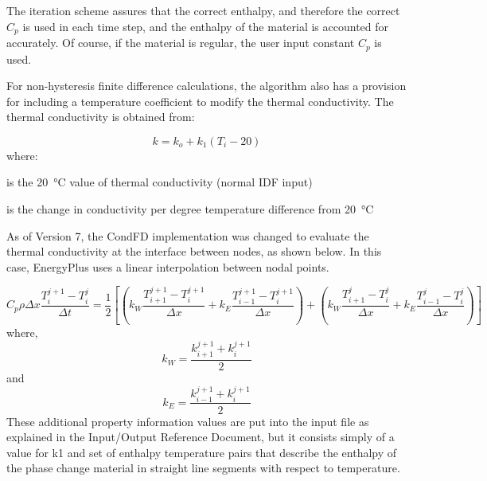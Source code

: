 The iteration scheme assures that the correct enthalpy, and therefore the
correct $C_p$ is used in each time step, and the enthalpy of the material is
accounted for accurately. Of course, if the material is regular, the user input
constant $C_p$ is used.

For non-hysteresis finite difference calculations, the algorithm also has a
provision for including a temperature coefficient to modify the thermal
conductivity. The thermal conductivity is obtained from:

\begin{equation}
k = k_o + k_1\left( T_i - 20 \right)
\end{equation}
%
where:
\begin{wherelist}
\item[k_o] is the \SI{20}{\celsius} value of thermal conductivity (normal IDF
input)
\item[k_1] is the change in conductivity per degree temperature difference from
\SI{20}{\celsius}
\end{wherelist}

As of Version 7, the CondFD implementation was changed to evaluate the thermal
conductivity at the interface between nodes, as shown below. In this case,
EnergyPlus uses a linear interpolation between nodal points.

\begin{equation}
C_p\rho\Delta x\frac{T_i^{j + 1} - T_i^j}{\Delta t} =
\frac{1}{2}\left[ \left( k_W\frac{T_{i + 1}^{j + 1} - T_i^{j + 1}}{\Delta x}
                       + k_E\frac{T_{i - 1}^{j + 1} - T_i^{j + 1}}{\Delta x}
                 \right)
                + \left( k_W\frac{T_{i + 1}^j - T_i^j}{\Delta x}
                       + k_E\frac{T_{i - 1}^j - T_i^j}{\Delta x}\right)\right]
\end{equation}
%
where,
%
\begin{equation}
k_W = \frac{k_{i + 1}^{j + 1} + k_i^{j + 1}}{2}
\end{equation}
%
and
%
\begin{equation}
k_E = \frac{k_{i - 1}^{j + 1} + k_i^{j + 1}}{2}
\end{equation}
%
These additional property information values are put into the input file as
explained in the Input/Output Reference Document, but it consists simply of a
value for k1 and set of enthalpy temperature pairs that describe the enthalpy of
the phase change material in straight line segments with respect to temperature.

